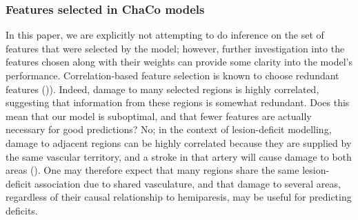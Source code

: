 \documentclass[10pt]{article}
\begin{document}
\subsubsection*{Features selected in ChaCo models}

In this paper, we are explicitly not attempting to do inference on the set of features that were selected by the model; however, further investigation into the features chosen along with their weights can provide some clarity into the model's performance. Correlation-based feature selection is known to choose redundant features (\cite{Guyon2003-kj})). Indeed, damage to many selected regions is highly correlated, suggesting that information from these regions is somewhat redundant. Does this mean that our model is suboptimal, and that fewer features are actually necessary for good predictions? No; in the context of lesion-deficit modelling, damage to adjacent regions can be highly correlated because they are supplied by the same vascular territory, and a stroke in that artery will cause damage to both areas (\cite{Mah2014-cb, Sperber2020-kp}). One may therefore expect that many regions share the same lesion-deficit association due to shared vasculature, and that damage to several areas, regardless of their causal relationship to hemiparesis, may be useful for predicting deficits. 
\end{document}

